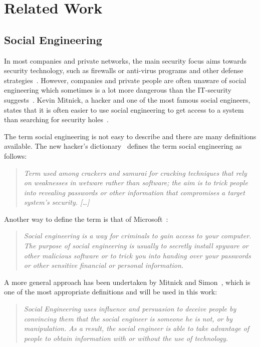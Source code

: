 \chapter{Related Work}
\label{chap:relatedwork}

\section{Social Engineering}

In most companies and private networks, the main security focus aims towards
security technology, such as firewalls or anti-virus programs and other defense
strategies~\cite{winkler1995}. However, companies and private people are often
unaware of social engineering which sometimes is a lot more dangerous than the
IT-security suggests~\cite{jones2004}. Kevin Mitnick, a hacker and one of the
most famous social engineers, states that it is often easier to use social
engineering to get access to a system than searching for security
holes~\cite{mitnick2003}.

The term social engineering is not easy to describe and there are many
definitions available. 
The new hacker's dictionary~\cite{raymond1996} defines the term social engineering as
follows:
\begin{quote}
\textit{Term used among crackers and samurai for cracking techniques that rely on
weaknesses in wetware rather than software; the aim is to trick people into
revealing passwords or other information that compromises a target system's
security. [\dots]}
\end{quote}

Another way to define the term is that of Microsoft~\cite{microsoft2009}:
\begin{quote}
\textit{Social engineering is a way for criminals to gain access to your computer. The
purpose of social engineering is usually to secretly install spyware or other
malicious software or to trick you into handing over your passwords or other
sensitive financial or personal information.}
\end{quote}

A more general approach has been undertaken by Mitnick and Simon~\cite{mitnick2003}, which
is one of the most appropriate definitions and will be used in this work:
\begin{quote}
\textit{Social Engineering uses influence and persuasion to deceive people
by convincing them that the social engineer is someone he is not,
or by manipulation. As a result, the social engineer is able to take
advantage of people to obtain information with or without the use of
technology.}
\end{quote}


